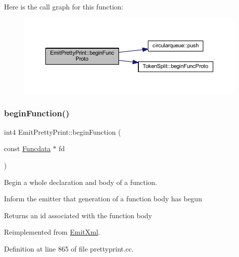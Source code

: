 Here is the call graph for this function\+:
\nopagebreak
\begin{figure}[H]
\begin{center}
\leavevmode
\includegraphics[width=350pt]{class_emit_pretty_print_a242bc11dbb30efeb41f7e4ad39169450_cgraph}
\end{center}
\end{figure}
\mbox{\label{class_emit_pretty_print_afc7d7ad8e92e3aebb5098ab3aa90153d}} 
\subsubsection{\texorpdfstring{beginFunction()}{beginFunction()}}
{\footnotesize\ttfamily int4 Emit\+Pretty\+Print\+::begin\+Function (\begin{DoxyParamCaption}\item[{const \mbox{\hyperlink{class_funcdata}{Funcdata}} $\ast$}]{fd }\end{DoxyParamCaption})\hspace{0.3cm}{\ttfamily [virtual]}}



Begin a whole declaration and body of a function. 

Inform the emitter that generation of a function body has begun \begin{DoxyReturn}{Returns}
an id associated with the function body 
\end{DoxyReturn}


Reimplemented from \mbox{\hyperlink{class_emit_xml_acff5f33b9ab6a4a036688160c98c0aa9}{Emit\+Xml}}.



Definition at line 865 of file prettyprint.\+cc.

